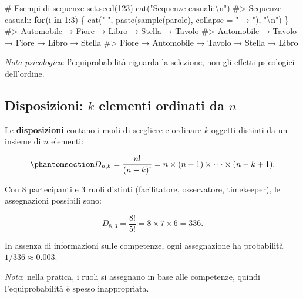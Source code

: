 \documentclass[
  italian,
  letterpaper,
  a4paper,
  11pt,
  open=any]{scrbook}
\newenvironment{Shaded}{\begin{snugshade}}{\end{snugshade}}
\newcommand{\AttributeTok}[1]{\textcolor[rgb]{0.40,0.45,0.13}{#1}}
\newcommand{\CommentTok}[1]{\textcolor[rgb]{0.37,0.37,0.37}{#1}}
\newcommand{\ControlFlowTok}[1]{\textcolor[rgb]{0.00,0.23,0.31}{\textbf{#1}}}
\newcommand{\DecValTok}[1]{\textcolor[rgb]{0.68,0.00,0.00}{#1}}
\newcommand{\FunctionTok}[1]{\textcolor[rgb]{0.28,0.35,0.67}{#1}}
\newcommand{\NormalTok}[1]{\textcolor[rgb]{0.00,0.23,0.31}{#1}}
\newcommand{\SpecialCharTok}[1]{\textcolor[rgb]{0.37,0.37,0.37}{#1}}
\newcommand{\StringTok}[1]{\textcolor[rgb]{0.13,0.47,0.30}{#1}}
\theoremstyle{plain}
\theoremstyle{definition}
\theoremstyle{definition}
\theoremstyle{remark}
\begin{document}
\begin{tcolorbox}
\begin{Shaded}
\begin{Highlighting}[]
\CommentTok{\# Esempi di sequenze}
\FunctionTok{set.seed}\NormalTok{(}\DecValTok{123}\NormalTok{)}
\FunctionTok{cat}\NormalTok{(}\StringTok{"Sequenze casuali:}\SpecialCharTok{\textbackslash{}n}\StringTok{"}\NormalTok{)}
\CommentTok{\#\textgreater{} Sequenze casuali:}
\ControlFlowTok{for}\NormalTok{(i }\ControlFlowTok{in} \DecValTok{1}\SpecialCharTok{:}\DecValTok{3}\NormalTok{) \{}
  \FunctionTok{cat}\NormalTok{(}\StringTok{" "}\NormalTok{, }\FunctionTok{paste}\NormalTok{(}\FunctionTok{sample}\NormalTok{(parole), }\AttributeTok{collapse =} \StringTok{" → "}\NormalTok{), }\StringTok{"}\SpecialCharTok{\textbackslash{}n}\StringTok{"}\NormalTok{)}
\NormalTok{\}}
\CommentTok{\#\textgreater{}   Automobile → Fiore → Libro → Stella → Tavolo }
\CommentTok{\#\textgreater{}   Automobile → Tavolo → Fiore → Libro → Stella }
\CommentTok{\#\textgreater{}   Fiore → Automobile → Tavolo → Stella → Libro}
\end{Highlighting}
\end{Shaded}

\emph{Nota psicologica}: l'equiprobabilità riguarda la selezione, non
gli effetti psicologici dell'ordine.

\end{tcolorbox}

\subsection{\texorpdfstring{Disposizioni: \(k\) elementi ordinati da
\(n\)}{Disposizioni: k elementi ordinati da n}}\label{disposizioni-k-elementi-ordinati-da-n}

Le \textbf{disposizioni} contano i modi di scegliere e ordinare \(k\)
oggetti distinti da un insieme di \(n\) elementi:

\begin{equation}\protect\phantomsection\label{eq-dispositions-def}{
D_{n,k} = \frac{n!}{(n-k)!}
       = n \times (n-1) \times \cdots \times (n-k+1).
}\end{equation}

\begin{tcolorbox}[enhanced jigsaw, arc=.35mm, bottomrule=.15mm, bottomtitle=1mm, breakable, colback=white, colbacktitle=quarto-callout-note-color!10!white, colframe=quarto-callout-note-color-frame, coltitle=black, left=2mm, leftrule=.75mm, opacityback=0, opacitybacktitle=0.6, rightrule=.15mm, title=\textcolor{quarto-callout-note-color}{\faInfo}\hspace{0.5em}{Esempio psicologico}, titlerule=0mm, toprule=.15mm, toptitle=1mm]

Con 8 partecipanti e 3 ruoli distinti (facilitatore, osservatore,
timekeeper), le assegnazioni possibili sono:

\[
D_{8,3} = \frac{8!}{5!} = 8 \times 7 \times 6 = 336.
\]

In assenza di informazioni sulle competenze, ogni assegnazione ha
probabilità \(1/336 \approx 0.003\).

\emph{Nota}: nella pratica, i ruoli si assegnano in base alle
competenze, quindi l'equiprobabilità è spesso inappropriata.

\end{tcolorbox}
\end{document}
